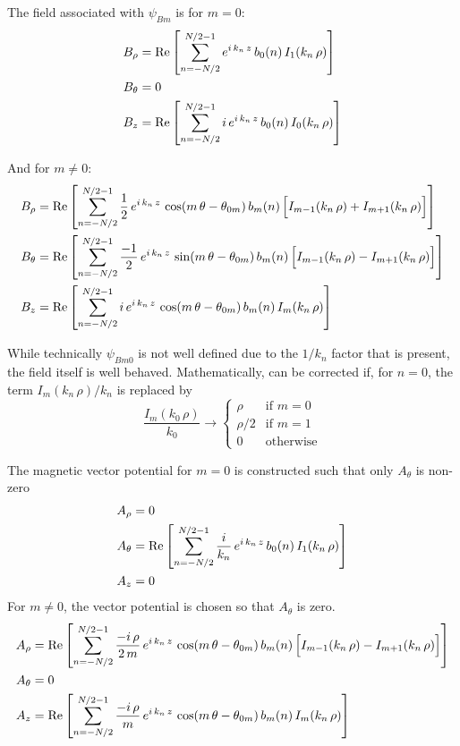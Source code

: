 The field associated with $\psi_{Bm}$ is for $m = 0$:
\begin{align}
  B_\rho &= \operatorname{Re} \left[ 
    \sum_{n=-N/2}^{N/2-1} e^{i \, k_n \, z} \, b_0(n) \,
    I_1(k_n \, \rho) \right] \nonumber \\
  B_\theta &= 0 \\
  B_z &= \operatorname{Re} \left[ 
    \sum_{n=-N/2}^{N/2-1} i \, e^{i \, k_n \, z} \, b_0(n) \,
    I_0(k_n \, \rho) \right]
    \nonumber
\end{align}

And for $m \neq 0$:
\begin{align}
  B_\rho &= \operatorname{Re} \left[ 
    \sum_{n=-N/2}^{N/2-1} \frac{1}{2} \, e^{i \, k_n \, z} \, 
    \cos (m \, \theta - \theta_{0m}) \, b_m(n) \,
    \Big[ I_{m-1}(k_n \, \rho) + I_{m+1}(k_n \, \rho) \Big] \right] \nonumber \\
  B_\theta &= \operatorname{Re} \left[ 
    \sum_{n=-N/2}^{N/2-1} \frac{-1}{2} \, e^{i \, k_n \, z} \, 
    \sin (m \, \theta - \theta_{0m}) \, b_m(n) \,
    \Big[ I_{m-1}(k_n \, \rho) - I_{m+1}(k_n \, \rho) \Big] \right] \\
  B_z &= \operatorname{Re} \left[ 
    \sum_{n=-N/2}^{N/2-1} i \, e^{i \, k_n \, z} \, 
    \cos (m \, \theta - \theta_{0m}) \, b_m(n) \,
    I_m(k_n \, \rho) \right]
    \nonumber
\end{align}

While technically $\psi_{Bm0}$ is not well defined due to the $1/k_n$ factor that is present, the
field itself is well behaved. Mathematically,  can be corrected if, for $n = 0$, the term
$I_m(k_n \, \rho) / k_n$ is replaced by
\begin{equation}
  \frac{I_m(k_0 \, \rho)}{k_0} \rightarrow 
  \begin{cases}
    \rho   &\text{if } m = 0 \\
    \rho/2 &\text{if } m = 1 \\
    0      &\text{otherwise}
  \end{cases}
\end{equation}

The magnetic vector potential for $m = 0$ is constructed such that only $A_\theta$ is non-zero
\begin{align}
  A_\rho &= 0 \nonumber \\
  A_\theta &= \operatorname{Re} \left[ 
    \sum_{n=-N/2}^{N/2-1} \frac{i}{k_n} \, e^{i \, k_n \, z} \, b_0(n) \, I_1(k_n \, \rho) \right] \\
  A_z    &= 0 \nonumber
\end{align}
For $m \ne 0$, the vector potential is chosen so that $A_\theta$ is zero.
\begin{align}
  A_\rho &= \operatorname{Re} \left[ 
    \sum_{n=-N/2}^{N/2-1} \frac{-i \, \rho}{2 \, m} \, e^{i \, k_n \, z} \, 
    \cos (m \, \theta - \theta_{0m}) \, b_m(n) \,
    \Big[ I_{m-1}(k_n \, \rho) - I_{m+1}(k_n \, \rho) \Big] \right] \nonumber \\
  A_\theta &= 0 \\
  A_z    &= \operatorname{Re} \left[ 
    \sum_{n=-N/2}^{N/2-1} \frac{-i \, \rho}{m} \, e^{i \, k_n \, z} \, 
    \cos (m \, \theta - \theta_{0m}) \, b_m(n) \,
    I_m(k_n \, \rho) \right] \nonumber
\end{align}

